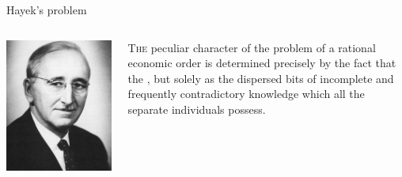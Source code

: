 \documentclass{beamer}                %
\begin{document}
\begin{frame}[label=Hayek-quote]{Hayek's problem\hfilll \hyperlink{Hayek-back}{}}
\begin{block}{}
\begin{columns}
\begin{column}{0.25\textwidth}
\includegraphics[width=\textwidth]{./Images/Hayek.jpg}
\end{column}
\begin{column}{0.7\textwidth}
\begin{myquote}
\lettrine[findent=3.5pt,nindent=-3pt]{T}{he} peculiar character of the problem of a rational economic order is determined precisely by the fact that the , but solely as the dispersed bits of incomplete and frequently contradictory knowledge which all the separate individuals possess.
\end{myquote}
\end{column}
\end{columns}
\end{block}
\end{frame}
\end{document}
